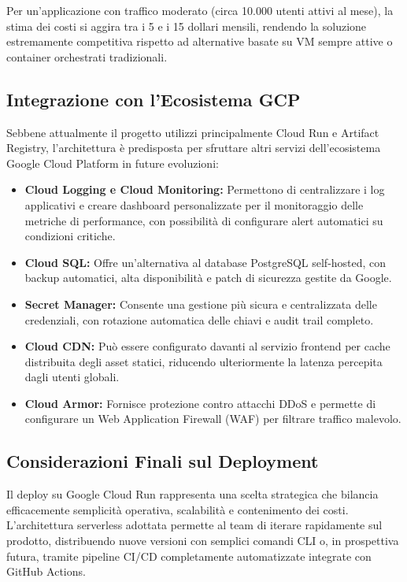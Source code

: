 Per un'applicazione con traffico moderato (circa 10.000 utenti attivi al mese), la stima dei costi si aggira tra i 5 e i 15 dollari mensili, rendendo la soluzione estremamente competitiva rispetto ad alternative basate su VM sempre attive o container orchestrati tradizionali.

\subsection{Integrazione con l'Ecosistema GCP}
Sebbene attualmente il progetto utilizzi principalmente Cloud Run e Artifact Registry, l'architettura è predisposta per sfruttare altri servizi dell'ecosistema Google Cloud Platform in future evoluzioni:

\begin{itemize}
    \item \textbf{Cloud Logging e Cloud Monitoring:} Permettono di centralizzare i log applicativi e creare dashboard personalizzate per il monitoraggio delle metriche di performance, con possibilità di configurare alert automatici su condizioni critiche.
    
    \item \textbf{Cloud SQL:} Offre un'alternativa al database PostgreSQL self-hosted, con backup automatici, alta disponibilità e patch di sicurezza gestite da Google.
    
    \item \textbf{Secret Manager:} Consente una gestione più sicura e centralizzata delle credenziali, con rotazione automatica delle chiavi e audit trail completo.
    
    \item \textbf{Cloud CDN:} Può essere configurato davanti al servizio frontend per cache distribuita degli asset statici, riducendo ulteriormente la latenza percepita dagli utenti globali.
    
    \item \textbf{Cloud Armor:} Fornisce protezione contro attacchi DDoS e permette di configurare un Web Application Firewall (WAF) per filtrare traffico malevolo.
\end{itemize}

\subsection{Considerazioni Finali sul Deployment}
Il deploy su Google Cloud Run rappresenta una scelta strategica che bilancia efficacemente semplicità operativa, scalabilità e contenimento dei costi. L'architettura serverless adottata permette al team di iterare rapidamente sul prodotto, distribuendo nuove versioni con semplici comandi CLI o, in prospettiva futura, tramite pipeline CI/CD completamente automatizzate integrate con GitHub Actions.

